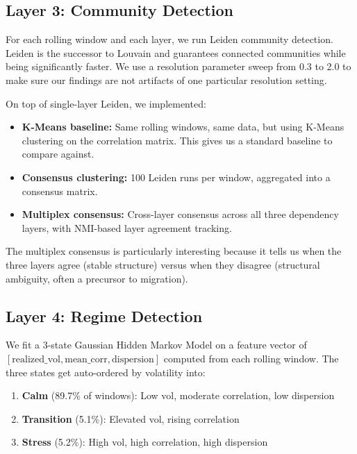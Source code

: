 \documentclass[12pt, letterpaper]{article}
\begin{document}
\subsection{Layer 3: Community Detection}

For each rolling window and each layer, we run Leiden community detection. Leiden is the successor to Louvain and guarantees connected communities while being significantly faster. We use a resolution parameter sweep from 0.3 to 2.0 to make sure our findings are not artifacts of one particular resolution setting.

On top of single-layer Leiden, we implemented:

\begin{itemize}
    \item \textbf{K-Means baseline:} Same rolling windows, same data, but using K-Means clustering on the correlation matrix. This gives us a standard baseline to compare against.
    \item \textbf{Consensus clustering:} 100 Leiden runs per window, aggregated into a consensus matrix.
    \item \textbf{Multiplex consensus:} Cross-layer consensus across all three dependency layers, with NMI-based layer agreement tracking.
\end{itemize}

The multiplex consensus is particularly interesting because it tells us when the three layers agree (stable structure) versus when they disagree (structural ambiguity, often a precursor to migration).

\subsection{Layer 4: Regime Detection}

We fit a 3-state Gaussian Hidden Markov Model on a feature vector of $[\text{realized\_vol}, \text{mean\_corr}, \text{dispersion}]$ computed from each rolling window. The three states get auto-ordered by volatility into:

\begin{enumerate}
    \item \textbf{Calm} (89.7\% of windows): Low vol, moderate correlation, low dispersion
    \item \textbf{Transition} (5.1\%): Elevated vol, rising correlation
    \item \textbf{Stress} (5.2\%): High vol, high correlation, high dispersion
\end{enumerate}
\end{document}
